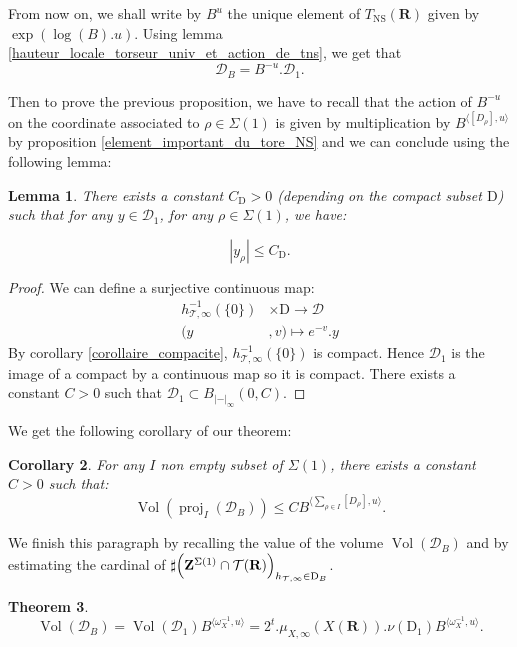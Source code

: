 \documentclass{proc-l}
\newcommand{\R}{\mathbf{R}}
\newcommand{\Z}{\mathbf{Z}}
\DeclareMathOperator{\proj}{proj}
\DeclareMathOperator{\Vol}{Vol}
\DeclareMathOperator{\NS}{NS}
\newcommand{\stackT}{\mathcal{T}}
\newcommand{\w}{\omega}
\newtheorem{theorem}{Theorem}[section]
\newtheorem{cor}[theorem]{Corollary}
\newtheorem{lemma}[theorem]{Lemma}
\theoremstyle{definition}
\theoremstyle{remark}
\numberwithin{equation}{section}
\begin{document}
From now on, we shall write by $B^{u}$ the unique element of $T_{\NS}(\R)$ given by $\exp(\log(B).u)$. Using lemma \ref{hauteur_locale_torseur_univ_et_action_de_tns}, we get that $$\mathcal{D}_{B} = B^{-u}. \mathcal{D}_1 .$$

Then to prove the previous proposition, we have to recall that the action of $B^{-u}$ on the coordinate associated to $\rho \in \Sigma(1)$ is given by multiplication by $B^{ \langle [D_{\rho}],u\rangle }$ by proposition \ref{element_important_du_tore_NS} and we can conclude using the following lemma:


\begin{lemma}\label{majoration_crucial_dans_un_compact}
    There exists a constant $C_{\mathrm{D}} > 0$ (depending on the compact subset $\mathrm{D}$) such that for any $y \in \mathcal{D}_{1}$, for any $\rho \in \Sigma(1)$, we have:
    
    $$ |y_{\rho}| \leq C_{\mathrm{D}} .$$
\end{lemma}

\begin{proof}
    We can define a surjective continuous map:
    \begin{align*}
        h_{\stackT,\infty}^{-1}(\{0\}) &\times \mathrm{D} \rightarrow \mathcal{D} \\
        (y&,v) \longmapsto e^{-v} . y
    \end{align*}
    By corollary \ref{corollaire_compacite}, $h_{\stackT,\infty}^{-1}(\{0\})$ is compact. Hence $\mathcal{D}_1$ is the image of a compact by a continuous map so it is compact. There exists a constant $C > 0$ such that $\mathcal{D}_1 \subset B_{|-|_{\infty}}(0,C)$.
\end{proof}


We get the following corollary of our theorem:

\begin{cor}
    For any $I$ non empty subset of $\Sigma(1)$, there exists a constant $C > 0$ such that:
    $$\Vol(\proj_I(\mathcal{D}_{B})) \leq C B^{ \langle \sum\limits_{\rho \in I} [D_{\rho}] , u \rangle } .$$
\end{cor}

We finish this paragraph by recalling the value of the volume $\Vol(\mathcal{D}_{B}) $ and by estimating the cardinal of $\sharp \Bigl( \Z^{\Sigma(1)} \cap \stackT(\R) \Bigr)_{h_{\stackT,\infty} \in \mathrm{D}_{B}}$.

\begin{theorem}
    $$\Vol(\mathcal{D}_{B}) =  \Vol(\mathcal{D}_1) B^{ \langle \w_{X}^{-1} , u \rangle } = 2^t. \mu_{X,\infty}(X(\R)). \nu(\mathrm{D}_1) B^{ \langle \w_{X}^{-1} , u \rangle } . $$
\end{theorem}
\end{document}
